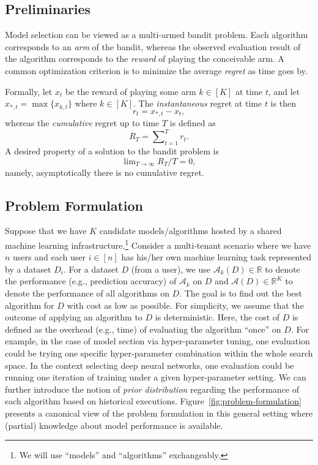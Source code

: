\documentclass[letterpaper]{vldb}
\newcommand{\cA}{\mathcal{A}}
\def\R{\mathbb{R}}
\begin{document}
\subsection{Preliminaries}

Model selection can be viewed as a multi-armed bandit problem.
Each algorithm corresponds to an \emph{arm} of the bandit, whereas the observed evaluation result of the algorithm corresponds to the \emph{reward} of playing the conceivable arm.
A common optimization criterion is to minimize the average \emph{regret} as time goes by.

Formally, let $x_t$ be the reward of playing some arm $k\in[K]$ at time $t$, and let $x_{*,t}=\max\{x_{k,t}\}$ where $k\in[K]$.
The {\em instantaneous} regret at time $t$ is then
\begin{equation}\label{eq:instant-regret}
r_t=x_{*,t}-x_t,
\end{equation}
whereas the {\em cumulative} regret up to time $T$ is defined as 
\begin{equation}\label{eq:cumulative-regret}
R_{T}=\sum\nolimits_{t=1}^{T}r_t.
\end{equation}
A desired property of a solution to the bandit problem is
\begin{equation}\label{eq:regret-free}
\lim\nolimits_{T\to\infty}R_T/T=0,
\end{equation}
namely, asymptotically there is no cumulative regret.

\subsection{Problem Formulation}

Suppose that we have $K$ candidate models/algorithms hosted by a shared machine learning infrastructure.\footnote{We will use ``models'' and ``algorithms'' exchangeably.}
Consider a multi-tenant scenario where we have $n$ users and each user $i\in[n]$ has his/her own machine learning task represented by a dataset $D_i$.
For a dataset $D$ (from a user), we use $\cA_k(D) \in \R$ to denote the performance (e.g., prediction accuracy) of $\cA_k$ on $D$ and $\cA(D) \in \R^K$ to denote the performance of all algorithms on $D$.
The goal is to find out the best algorithm for $D$ with cost as low as possible.
For simplicity, we assume that the outcome of applying an algorithm to $D$ is deterministic.
Here, the cost of $D$ is defined as the overhead (e.g., time) of evaluating the algorithm ``once'' on $D$.
For example, in the case of model section via hyper-parameter tuning, one evaluation could be trying one specific hyper-parameter combination within the whole search space.
In the context selecting deep neural networks, one evaluation could be running one iteration of training under a given hyper-parameter setting.
We can further introduce the notion of \emph{prior distribution} regarding the performance of each algorithm based on historical executions.
Figure~\ref{fig:problem-formulation} presents a canonical view of the problem formulation in this general setting where (partial) knowledge about model performance is available.
\end{document}
